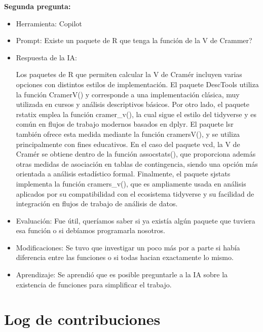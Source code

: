 \documentclass[12pt]{article}
\begin{document}
\textbf{Segunda pregunta:}
\begin{itemize}
    \item Herramienta: Copilot
    \item Prompt: Existe un paquete de R que tenga la función de la V de Crammer?
    \item Respuesta de la IA:  

Los paquetes de R que permiten calcular la V de Cramér incluyen varias opciones 
con distintos estilos de implementación. El paquete DescTools utiliza la función CramerV() 
y corresponde a una implementación clásica, muy utilizada en cursos y análisis descriptivos 
básicos. Por otro lado, el paquete rstatix emplea la función cramer\_v(), la cual sigue el 
estilo del tidyverse y es común en flujos de trabajo modernos basados en dplyr. El paquete 
lsr también ofrece esta medida mediante la función cramersV(), y se utiliza principalmente 
con fines educativos. En el caso del paquete vcd, la V de Cramér se obtiene dentro de la 
función assocstats(), que proporciona además otras medidas de asociación en tablas de 
contingencia, siendo una opción más orientada a análisis estadístico formal. Finalmente, 
el paquete sjstats implementa la función cramers\_v(), que es ampliamente usada en 
análisis aplicados por su compatibilidad con el ecosistema tidyverse y su facilidad 
de integración en flujos de trabajo de análisis de datos.

    \item Evaluación: Fue útil, queríamos saber si ya existía algún paquete que tuviera esa 
    función o si debíamos programarla nosotros. 
    \item Modificaciones: Se tuvo que investigar un poco más por a parte si había diferencia 
    entre las funciones o si todas hacian exactamente lo mismo. 
    \item Aprendizaje: Se aprendió que es posible preguntarle a la IA sobre la existencia de 
    funciones para simplificar el trabajo. 
\end{itemize}

\section{Log de contribuciones}
\end{document}
